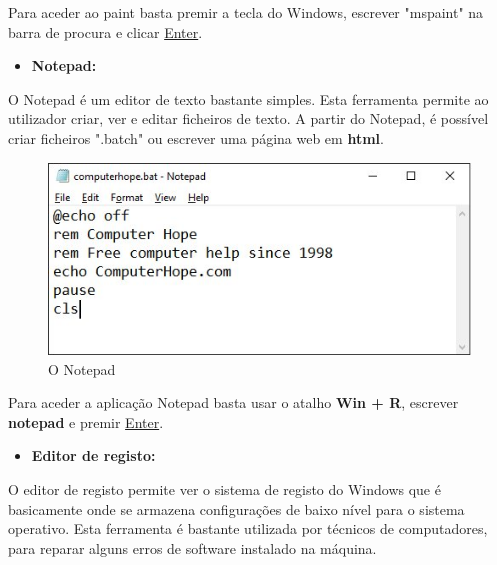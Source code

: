\documentclass{report}
\begin{document}
Para aceder ao paint basta premir a tecla do Windows, escrever "mspaint" na barra de procura e clicar \underline{Enter}.

\begin{itemize}
    \item \textbf{Notepad:}
\end{itemize}

O Notepad é um editor de texto bastante simples. Esta ferramenta permite ao utilizador criar, ver e editar ficheiros de texto. A partir do Notepad, é possível criar ficheiros ".batch" ou escrever uma página web em \textbf{\acs{html}}.

\begin{figure}[h!]
\includegraphics[width=1\textwidth]{notepad-computerhope.jpg}
\centering
\caption{O Notepad}
\end{figure}

Para aceder a aplicação Notepad basta usar o atalho \textbf{Win + R},  
escrever \textbf{notepad} e premir  \underline{Enter}.

\begin{itemize}
    \item \textbf{Editor de registo:}
\end{itemize}

O editor de registo permite ver o sistema de registo do Windows que é basicamente onde se armazena configurações de baixo nível para o sistema operativo. Esta ferramenta é bastante utilizada por técnicos de computadores, para reparar alguns erros de software instalado na máquina.
\end{document}
